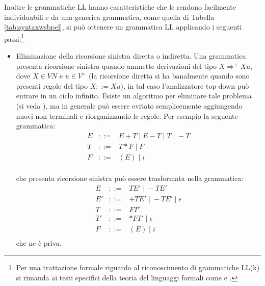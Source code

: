 Inoltre le grammatiche LL hanno caratteristiche che le rendono facilmente
individuabili e da una generica grammatica, come quella di
Tabella \ref{tab:syntaxwsbpel}, si può ottenere un grammatica LL applicando i seguenti
passi:\footnote{Per una trattazione formale riguardo al riconoscimento di
grammatiche LL(k) si rimanda ai testi specifici della teoria del linguaggi
formali come \cite{Bruno} e \cite{DragonBook}.} 
\begin{itemize}
  \item Eliminazione della ricorsione sinistra diretta o indiretta. Una
  grammatica presenta ricorsione sinistra quando ammette derivazioni del tipo
 $X \Rightarrow^+ Xu$, dove $X \in VN$ e $u \in V^+$ (la ricorsione diretta si
 ha banalmente quando sono presenti regole del tipo $X ::= Xu$), in tal caso
 l'analizzatore top-down può entrare in un ciclo infinito. Esiste un algoritmo
 per eliminare tale problema (si veda \cite{Bruno}), ma in generale può
 essere evitato semplicemente aggiungendo nuovi non terminali e riorganizzando
 le regole. Per esempio la seguente grammatica: 
 $$
 \begin{array}{rcl} 
  E & ::= & E + T \; | \; E - T \; |\; T \;|\; -T \\
  T & ::= & T * F \; | \; F \\
  F & ::= & (E) \; | \; i \\
 \end{array}
 $$
 
 che presenta ricorsione sinistra può essere trasformata nella grammatica:
 $$
 \begin{array}{rcl} 
  E  & ::= & TE' \; | \; - TE' \\
  E' & ::= & +TE' \; | \; - TE' \; | \; \epsilon \\
  T  & ::= &  FT' \\
  T' & ::= & *FT' \; | \; \epsilon \\
  F & ::= & (E) \; | \; i \\
 \end{array}
 $$
 che ne è priva.
 

\end{itemize}
